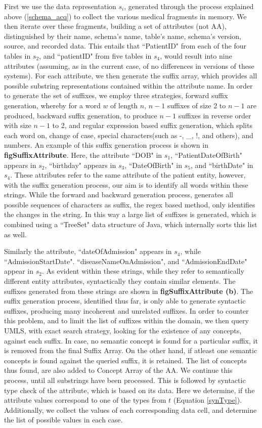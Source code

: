 First we use the data representation $s_i$, generated through the process explained above (\ref{schema_acq}) to collect the various medical fragments in memory. We then iterate over these fragments, building a set of attributes (not AA), distinguished by their name, schema's name, table's name, schema's version, source, and recorded data. This entails that ``PatientID" from each of the four tables in $s_2$, and ``patientID" from five tables in $s_4$, would result into nine attributes (assuming, as in the current case, of no differences in versions of these systems).
For each attribute, we then generate the suffix array, which provides all possible substring representations contained within the attribute name. In order to generate the set of suffixes, we employ three strategies, forward suffix generation, whereby for a word $w$ of length $n$, $n-1$ suffixes of size 2 to $n-1$ are produced, backward suffix generation, to produce $n-1$ suffixes in reverse order with size $n-1$ to 2, and regular expression based suffix generation, which splits each word on, change of case, special characters(such as -, \_, !, and others), and numbers. An example of this suffix generation process is shown in \textbf{figSuffixAttribute}. 
Here, the attribute ``DOB" in $s_1$, ``PatientDateOfBirth" appears in $s_2$, ``birthday" appears in $s_3$, ``DateOfBirth" in $s_5$, and ``birthDate" in $s_4$. These attributes refer to the same attribute of the patient entity, however, with the suffix generation process, our aim is to identify all words within these strings. While the forward and backward generation process, generates all possible sequences of characters as suffix, the regex based method, only identifies the changes in the string. In this way a large list of suffixes is generated, which is combined using a ``TreeSet" data structure of Java, which internally sorts this list as well.

Similarly the attribute, ``dateOfAdmission" appears in $s_4$, while ``AdmissionStartDate". ``diseaseNameOnAdmission", and ``AdmissionEndDate" appear in $s_2$. As evident within these strings, while they refer to semantically different entity attributes, syntactically they contain similar elements. The suffixes generated from these strings are shown in \textbf{figSuffixAttribute (b)}. The suffix generation process, identified thus far, is only able to generate syntactic suffixes, producing many incoherent and unrelated suffixes. In order to counter this problem, and to limit the list of suffixes within the domain, we then query UMLS, with exact search strategy, looking for the existence of any concepts, against each suffix. In case, no semantic concept is found for a particular suffix, it is removed from the final Suffix Array. On the other hand, if atleast one semantic concepts is found against the queried suffix, it is retained. The list of concepts thus found, are also added to Concept Array of the AA. We continue this process, until all substrings have been processed. This is followed by syntactic type check of the attribute, which is based on its data. Here we determine, if the attribute values correspond to one of the types from $t$ (Equation \eqref{synType}). Additionally, we collect the values of each corresponding data cell, and determine the list of possible values in each case. 

